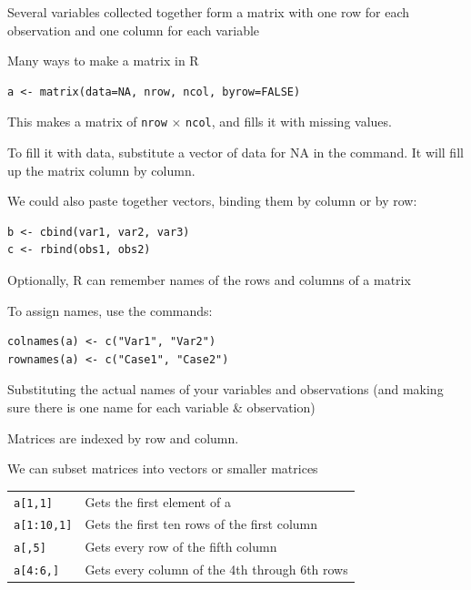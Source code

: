 \documentclass[pdflatex,landscape,titlepage]{foils}
\begin{document}
Several variables collected together form a matrix with one row for each observation and one column for each variable


Many ways to make a matrix in R

\begin{verbatim}
a <- matrix(data=NA, nrow, ncol, byrow=FALSE)
\end{verbatim}

This makes a matrix of \texttt{nrow} $\times$ \texttt{ncol}, and fills it with missing values.

To fill it with data, substitute a vector of data for NA in the command.  It will fill up the matrix column by column.

We could also paste together vectors, binding them by column or by row:

\begin{verbatim}
b <- cbind(var1, var2, var3)
c <- rbind(obs1, obs2)
\end{verbatim}


Optionally, R can remember names of the rows and columns of a matrix

To assign names, use the commands:

\begin{verbatim}
colnames(a) <- c("Var1", "Var2")
rownames(a) <- c("Case1", "Case2")
\end{verbatim}

Substituting the actual names of your variables and observations (and making sure there is one name for each variable \& observation)


Matrices are indexed by row and column.

We can subset matrices into vectors or smaller matrices

\begin{tabular}{ll}
\texttt{a[1,1]}      &  Gets the first element of a \\
\texttt{a[1:10,1]}   &  Gets the first ten rows of the first column \\
\texttt{a[,5]}       &  Gets every row of the fifth column \\
\texttt{a[4:6,]}     &  Gets every column of the 4th through 6th rows \\
\end{tabular}
\end{document}
